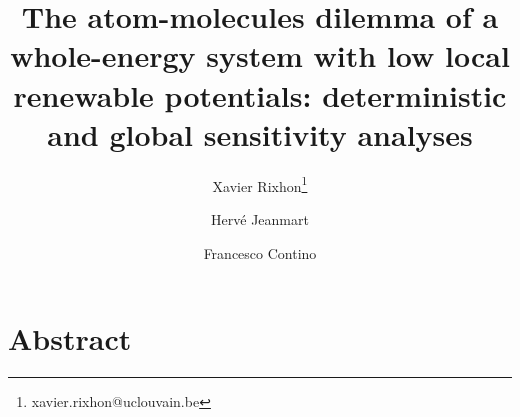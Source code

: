 \documentclass[11pt,twoside,a4paper,english]{article}
\begin{document}
\begin{titlepage}


\title{The atom-molecules dilemma of a whole-energy system with low local renewable potentials: deterministic and global sensitivity analyses}

\author[1]{Xavier Rixhon\thanks{xavier.rixhon@uclouvain.be}}
\author[1]{Hervé Jeanmart}
\author[1]{Francesco Contino}







\date{} %
{\let\newpage\relax\maketitle}

\tableofcontents
\printglossaries

\end{titlepage}



\section*{Abstract}

\end{document}
